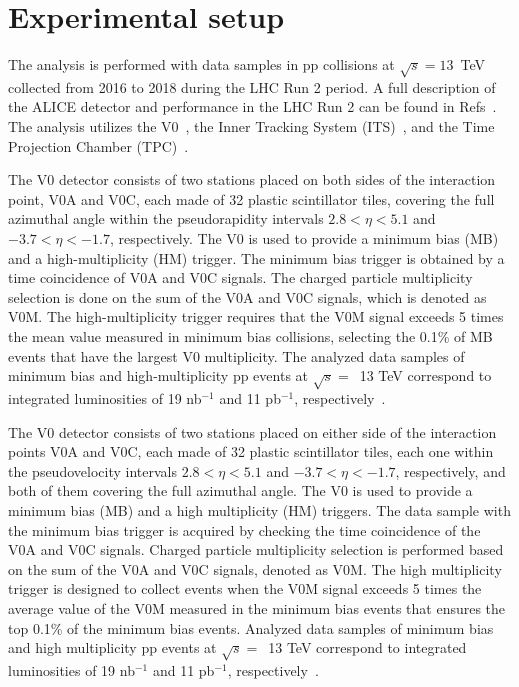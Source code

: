 

\section{Experimental setup}
\label{sec:experiment}
\label{sec:experiment}

The analysis is performed with data samples in pp collisions at $\sqrt{s} = 13$~TeV collected from 2016 to 2018 during the LHC Run 2 period. A full description of the ALICE detector and performance in the LHC Run 2 can be found in Refs~\cite{Aamodt:2008zz,Abelev:2014ffa}. The analysis utilizes the V0~\cite{Abbas:2013taa}, the Inner Tracking System (ITS)~\cite{aliceITS}, and the Time Projection Chamber (TPC)~\cite{aliceTPC}. 

The V0 detector consists of two stations placed on both sides of the interaction point, V0A and V0C, each made of 32 plastic scintillator tiles, covering the full azimuthal angle within the pseudorapidity intervals $2.8 < \eta < 5.1$ and $-3.7 < \eta < -1.7$, respectively. The V0 is used to provide a minimum bias (MB) and a high-multiplicity (HM) trigger. The minimum bias trigger is obtained by a time coincidence of V0A and V0C signals. The charged particle multiplicity selection is done on the sum of the V0A and V0C signals, which is denoted as V0M. The high-multiplicity trigger requires that the V0M signal exceeds 5 times the mean value measured in minimum bias collisions, selecting the 0.1\% of MB events that have the largest V0 multiplicity. The analyzed data samples of minimum bias and high-multiplicity pp events at $\sqrt{s}=$~13 TeV correspond to integrated luminosities of 19 nb$^{-1}$ and 11 pb$^{-1}$, respectively~\cite{ALICE-PUBLIC-2016-002}.

The V0 detector consists of two stations placed on either side of the interaction points V0A and V0C, each made of 32 plastic scintillator tiles, each one within the pseudovelocity intervals $2.8 < \eta < 5.1$ and $-3.7 < \eta < -1.7$, respectively, and both of them covering the full azimuthal angle. The V0 is used to provide a minimum bias (MB) and a high multiplicity (HM) triggers. The data sample with the minimum bias trigger is acquired by checking the time coincidence of the V0A and V0C signals. Charged particle multiplicity selection is performed based on the sum of the V0A and V0C signals, denoted as V0M. The high multiplicity trigger is designed to collect events when the V0M signal exceeds 5 times the average value of the V0M measured in the minimum bias events that ensures the top 0.1\% of the minimum bias events. Analyzed data samples of minimum bias and high multiplicity pp events at $\sqrt{s}=$~13 TeV correspond to integrated luminosities of 19 nb$^{-1}$ and 11 pb$^{-1}$, respectively~\cite{ALICE-PUBLIC-2016-002}. 

